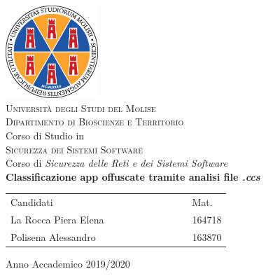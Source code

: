 \label{key}%



\begin{titlepage}
 \begin{center}
	 \includegraphics[width=3.5cm]{img/unimol/Unimol}\\
	 \vspace{0.8em}
	 {\Large \textsc{Università degli Studi del Molise}}\\
	 \vspace{0.8em}
	 {\Large \textsc{Dipartimento di Bioscienze e Territorio}}\\
	 \vspace{2em}
	 {\normalsize Corso di Studio in}\\
	 \vspace{1em}
	 {\Large \textsc{Sicurezza dei Sistemi Software}} \\
	 \vspace{1em}
	 {\normalsize Corso di \textit{Sicurezza delle Reti e dei Sistemi Software}}\\
	 \vspace{5em}
	{\LARGE\textbf{Classificazione app offuscate tramite analisi file \textit{.ccs}}} \\
	\vspace{1em}
 \end{center}

\vskip 2.2cm
  \begin{center}
	\begin{tabular}{l c c c c c c c c l}
	  Candidati & & & & & & & & & Mat.\\[0.3cm]
	  \large{La Rocca Piera Elena} & &  & & & & & & &164718\\[0.2cm]
	  \large{Polisena Alessandro} & & & & & & & & &163870\\
	\end{tabular}
\vfill

{\normalsize Anno Accademico 2019/2020}
\end{center}
\end{titlepage}
\clearpage